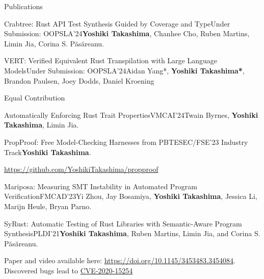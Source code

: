 \documentclass{resume} %
\begin{document}
\begin{rSection}{Publications}
  \begin{rPubsection}{Crabtree: Rust API Test Synthesis Guided by
      Coverage and Type}{Under Submission: OOPSLA'24}{\textbf{Yoshiki
        Takashima}, Chanhee Cho, Ruben Martins, Limin Jia, Corina
      S. P\u{a}s\u{a}reanu.}{}
  \end{rPubsection}

  \begin{rPubsection}{VERT: Verified Equivalent Rust Transpilation
      with Large Language Models}{Under Submission: OOPSLA'24}{Aidan Yang*,
      \textbf{Yoshiki Takashima*}, Brandon Paulsen, Joey Dodds, Daniel
      Kroening}{}

    {\footnotesize *Equal Contribution}
  \end{rPubsection}

  \begin{rPubsection}{Automatically Enforcing Rust Trait
      Properties}{VMCAI'24}{Twain Byrnes, \textbf{Yoshiki Takashima}, Limin
      Jia.}{}
  \end{rPubsection}

  \begin{rPubsection}{PropProof: Free Model-Checking Harnesses from
      PBT}{ESEC/FSE’23 Industry Track}{\textbf{Yoshiki Takashima}.}{}

    {\footnotesize
      \href{https://github.com/YoshikiTakashima/propproof}
      {https://github.com/YoshikiTakashima/propproof}}
  \end{rPubsection}

  \begin{rPubsection}{Mariposa: Measuring SMT Instability in Automated
      Program Verification}{FMCAD'23}{Yi Zhou, Jay Bosamiya, \textbf{Yoshiki
      Takashima}, Jessica Li, Marijn Heule, Bryan Parno.}{}

  \end{rPubsection}

  \begin{rPubsection}{SyRust: Automatic Testing of Rust Libraries with
      Semantic-Aware Program Synthesis}{PLDI'21}{\textbf{Yoshiki Takashima},
      Ruben Martins, Limin Jia, and Corina S. P\u{a}s\u{a}reanu.}{}

    {\footnotesize Paper and video available here:
      \href{https://doi.org/10.1145/3453483.3454084}
      {https://doi.org/10.1145/3453483.3454084}. Discovered bugs lead
      to
      \href{https://nvd.nist.gov/vuln/detail/CVE-2020-15254}{CVE-2020-15254}}
  \end{rPubsection}


\end{rSection}
\end{document}
